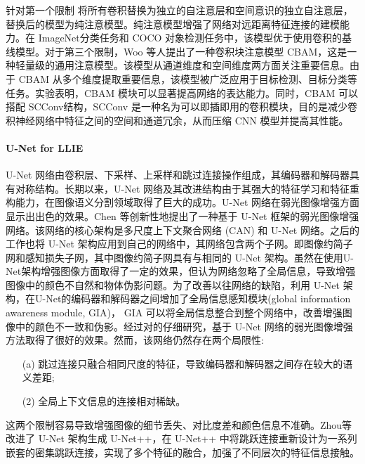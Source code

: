 \documentclass[a4paper, 10pt]{article}
\begin{document}
	针对第一个限制 \cite{ramachandran2019stand} 将所有卷积替换为独立的自注意层和空间意识的独立自注意层，替换后的模型为纯注意模型。纯注意模型增强了网络对远距离特征连接的建模能力。在 ImageNet分类任务和 COCO 对象检测任务中，该模型优于使用卷积的基线模型。对于第三个限制，Woo 等人\cite{woo2018cbam}提出了一种卷积块注意模型 CBAM，这是一种轻量级的通用注意模型。该模型从通道维度和空间维度两方面关注重要信息。由于 CBAM 从多个维度提取重要信息，该模型被广泛应用于目标检测、目标分类等任务。实验表明，CBAM 模块可以显著提高网络的表达能力。同时，CBAM 可以搭配 SCConv\cite{li2023scconv}结构，SCConv 是一种名为可以即插即用的卷积模块，目的是减少卷积神经网络中特征之间的空间和通道冗余，从而压缩 CNN 模型并提高其性能。
	
	\paragraph{U-Net for LLIE}
	
	U-Net 网络由卷积层、下采样、上采样和跳过连接操作组成，其编码器和解码器具有对称结构。长期以来，U-Net 网络及其改进结构由于其强大的特征学习和特征重构能力，在图像语义分割领域取得了巨大的成功。U-Net 网络在弱光图像增强方面显示出出色的效果。Chen 等\cite{chen2018learning}创新性地提出了一种基于 U-Net 框架的弱光图像增强网络。该网络的核心架构是多尺度上下文聚合网络 (CAN) 和 U-Net 网络。之后的工作\cite{chen2018learning, zamir2021learning}也将 U-Net 架构应用到自己的网络中，其网络包含两个子网。即图像约简子网和感知损失子网，其中图像约简子网具有与\cite{chen2018learning}相同的 U-Net 架构。虽然\cite{chen2018learning, zamir2021learning}在使用U-Net架构增强图像方面取得了一定的效果，但\cite{meng2020gia}认为\cite{chen2018learning, zamir2021learning}网络忽略了全局信息，导致增强图像中的颜色不自然和物体伪影问题。为了改善以往网络的缺陷，利用 U-Net 架构，\cite{meng2020gia}在U-Net的编码器和解码器之间增加了全局信息感知模块(global information awareness module, GIA)， GIA 可以将全局信息整合到整个网络中，改善增强图像中的颜色不一致和伪影。经过对\cite{chen2018learning, meng2020gia, zamir2021learning}的仔细研究，基于 U-Net 网络的弱光图像增强方法取得了很好的效果。然而，该网络仍然存在两个局限性:
	
	\begin{itemize}
		\item[(a)] 
		跳过连接只融合相同尺度的特征，导致编码器和解码器之间存在较大的语义差距;
		
		\item[(2)]
		全局上下文信息的连接相对稀缺。
	\end{itemize}	
	
	这两个限制容易导致增强图像的细节丢失、对比度差和颜色信息不准确。Zhou等\cite{zhou2018unet++,zhou2019unet++}改进了 U-Net 架构生成 U-Net++，在 U-Net++ 中将跳跃连接重新设计为一系列嵌套的密集跳跃连接，实现了多个特征的融合，加强了不同层次的特征信息接触。
	
\end{document}
